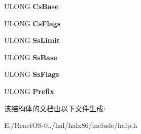 \begin{DoxyCompactItemize}
U\+L\+O\+NG {\bfseries Cs\+Base}
\item 
\mbox{\label{struct___h_a_l___b_i_o_s___f_r_a_m_e_aa82ea0d391080f763718f9362ffe8630}} 
U\+L\+O\+NG {\bfseries Cs\+Flags}
\item 
\mbox{\label{struct___h_a_l___b_i_o_s___f_r_a_m_e_a8b5e8aa995e21da9c0faa0de361050ac}} 
U\+L\+O\+NG {\bfseries Ss\+Limit}
\item 
\mbox{\label{struct___h_a_l___b_i_o_s___f_r_a_m_e_ae11d0d5c5906e3ab2cb5d9497d48c27a}} 
U\+L\+O\+NG {\bfseries Ss\+Base}
\item 
\mbox{\label{struct___h_a_l___b_i_o_s___f_r_a_m_e_a99d0c1aa2125d1aebcc1e652faa3122f}} 
U\+L\+O\+NG {\bfseries Ss\+Flags}
\item 
\mbox{\label{struct___h_a_l___b_i_o_s___f_r_a_m_e_adec1c6a7111c55d4e62f85dabe22090a}} 
U\+L\+O\+NG {\bfseries Prefix}
\end{DoxyCompactItemize}


该结构体的文档由以下文件生成\+:\begin{DoxyCompactItemize}
\item 
E\+:/\+React\+O\+S-\/0../hal/halx86/include/halp.\+h\end{DoxyCompactItemize}
